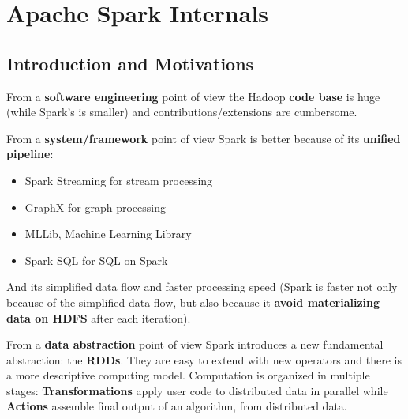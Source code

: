 \chapter{Apache Spark Internals}

\section{Introduction and Motivations}
	\par
	From a \textbf{software engineering} point of view the Hadoop \textbf{code base} is huge (while Spark's is smaller) and contributions/extensions are cumbersome.
	\newline
	\par\noindent
	From a \textbf{system/framework} point of view Spark is better because of its \textbf{unified pipeline}:
	\begin{itemize}
		\item Spark Streaming for stream processing
		\item GraphX for graph processing
		\item MLLib, Machine Learning Library
		\item Spark SQL for SQL on Spark
	\end{itemize}
	And its simplified data flow and faster processing speed (Spark is faster not only because of the simplified data flow, but also because it \textbf{avoid materializing data on HDFS} after each iteration).
	\newline
	\par\noindent
	From a \textbf{data abstraction} point of view Spark introduces a new fundamental abstraction: the \textbf{RDDs}. They are easy to extend with new operators and there is a more descriptive computing model. Computation is organized in multiple stages: \textbf{Transformations} apply user code to distributed data in parallel while \textbf{Actions} assemble final output of an algorithm, from distributed data.
